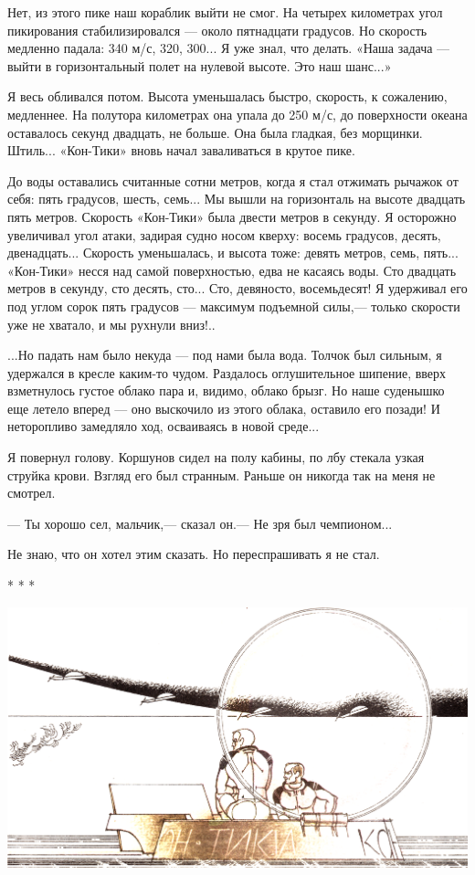\documentclass[11pt,a4paper,oneside]{article}
\begin{document}
Нет, из этого пике наш кораблик выйти не смог. На четырех километрах угол пикирования стабилизировался — около пятнадцати градусов. Но скорость медленно падала: 340 м/с, 320, 300... Я уже знал, что делать. «Наша задача — выйти в горизонтальный полет на нулевой высоте. Это наш шанс...»

Я весь обливался потом. Высота уменьшалась быстро, скорость, к сожалению, медленнее. На полутора километрах она упала до 250 м/с, до поверхности океана оставалось секунд двадцать, не больше. Она была гладкая, без морщинки. Штиль... «Кон-Тики» вновь начал заваливаться в крутое пике.

До воды оставались считанные сотни метров, когда я стал отжимать рычажок от себя: пять градусов, шесть, семь... Мы вышли на горизонталь на высоте двадцать пять метров. Скорость «Кон-Тики» была двести метров в секунду. Я осторожно увеличивал угол атаки, задирая судно носом кверху: восемь градусов, десять, двенадцать... Скорость уменьшалась, и высота тоже: девять метров, семь, пять... «Кон-Тики» несся над самой поверхностью, едва не касаясь воды. Сто двадцать метров в секунду, сто десять, сто... Сто, девяносто, восемьдесят! Я удерживал его под углом сорок пять градусов — максимум подъемной силы,— только скорости уже не хватало, и мы рухнули вниз!..

...Но падать нам было некуда — под нами была вода. Толчок был сильным, я удержался в кресле каким-то чудом. Раздалось оглушительное шипение, вверх взметнулось густое облако пара и, видимо, облако брызг. Но наше суденышко еще летело вперед — оно выскочило из этого облака, оставило его позади! И неторопливо замедляло ход, осваиваясь в новой среде...

Я повернул голову. Коршунов сидел на полу кабины, по лбу стекала узкая струйка крови. Взгляд его был странным. Раньше он никогда так на меня не смотрел.

— Ты хорошо сел, мальчик,— сказал он.— Не зря был чемпионом...

Не знаю, что он хотел этим сказать. Но переспрашивать я не стал.

* * *

\includegraphics[width=\textwidth]{sos2}
\end{document}
